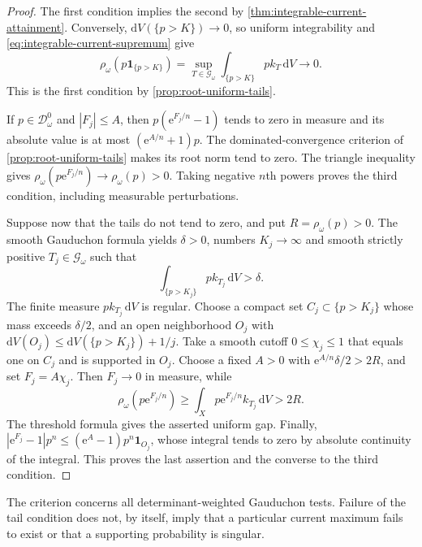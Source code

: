 \begin{proof}
The first condition implies the second by \cref{thm:integrable-current-attainment}. Conversely, $\mathrm{d}V(\{p>K\})\to0$, so uniform integrability and \eqref{eq:integrable-current-supremum} give
\[
 \rho_\omega(p\mathbf1_{\{p>K\}})
 =\sup_{T\in\mathscr G_\omega}\int_{\{p>K\}}p k_T\,\mathrm{d}V
 \longrightarrow0.
\]
This is the first condition by \cref{prop:root-uniform-tails}.

If $p\in\mathcal D_\omega^0$ and $|F_j|\leq A$, then $p(\mathrm{e}^{F_j/n}-1)$ tends to zero in measure and its absolute value is at most $(\mathrm{e}^{A/n}+1)p$. The dominated-convergence criterion of \cref{prop:root-uniform-tails} makes its root norm tend to zero. The triangle inequality gives $\rho_\omega(p\mathrm{e}^{F_j/n})\to\rho_\omega(p)>0$. Taking negative $n$th powers proves the third condition, including measurable perturbations.

Suppose now that the tails do not tend to zero, and put $R=\rho_\omega(p)>0$. The smooth Gauduchon formula yields $\delta>0$, numbers $K_j\to\infty$ and smooth strictly positive $T_j\in\mathscr G_\omega$ such that
\[
 \int_{\{p>K_j\}}p k_{T_j}\,\mathrm{d}V>\delta.
\]
The finite measure $p k_{T_j}\,\mathrm{d}V$ is regular. Choose a compact set $C_j\subset\{p>K_j\}$ whose mass exceeds $\delta/2$, and an open neighborhood $O_j$ with
$\mathrm{d}V(O_j)\leq\mathrm{d}V(\{p>K_j\})+1/j$. Take a smooth cutoff $0\leq\chi_j\leq1$ that equals one on $C_j$ and is supported in $O_j$. Choose a fixed $A>0$ with $\mathrm{e}^{A/n}\delta/2>2R$, and set $F_j=A\chi_j$. Then $F_j\to0$ in measure, while
\[
 \rho_\omega(p\mathrm{e}^{F_j/n})
 \geq\int_Xp\mathrm{e}^{F_j/n}k_{T_j}\,\mathrm{d}V
 >2R.
\]
The threshold formula gives the asserted uniform gap. Finally,
$|\mathrm{e}^{F_j}-1|p^n\leq(\mathrm{e}^A-1)p^n\mathbf1_{O_j}$, whose integral tends to zero by absolute continuity of the integral. This proves the last assertion and the converse to the third condition.
\end{proof}

The criterion concerns all determinant-weighted Gauduchon tests. Failure of the tail condition does not, by itself, imply that a particular current maximum fails to exist or that a supporting probability is singular.
